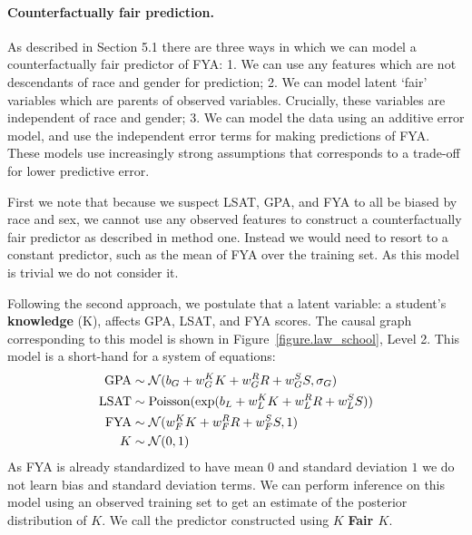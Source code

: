 \paragraph{Counterfactually fair prediction.}
As described in Section 5.1 there are three ways in which we can model a counterfactually fair predictor of FYA: 1. We can use any features which are not descendants of race and gender for prediction; 2. We can model latent `fair' variables which are parents of observed variables. Crucially, these variables are independent of race and gender; 3. We can model the data using an additive error model, and use the independent error terms for making predictions of FYA. These models use increasingly strong assumptions that corresponds to a trade-off for lower predictive error.

First we note that because we suspect LSAT, GPA, and FYA to all be biased by race and sex, we cannot use any observed features to construct a counterfactually fair predictor as described in method one. Instead we would need to resort to a constant predictor, such as the mean of FYA over the training set. As this model is trivial we do not consider it. 

Following the second approach, we postulate that a latent variable: a student's \textbf{knowledge} (K), affects GPA, LSAT, and FYA scores. The causal graph corresponding to this model is shown in Figure~\ref{figure.law_school}, Level 2. This model is a short-hand for a system of equations:
\begin{align}
\mbox{GPA} &\sim {\cal N}(b_{G} + w_{G}^K K + w_{G}^R R + w_{G}^S S, \sigma_{G}) \nonumber \\
\mbox{LSAT} &\sim \textrm{Poisson}(\exp(b_{L} + w_{L}^K K + w_{L}^R R + w_{L}^S S)) \nonumber \\
\mbox{FYA} &\sim {\cal N}(w_{F}^K K + w_{F}^R R + w_{F}^S S, 1) \nonumber \\
K &\sim {\cal N}(0,1) \nonumber
\end{align}
As FYA is already standardized to have mean $0$ and standard deviation $1$ we do not learn bias and standard deviation terms. We can perform inference on this model using an observed training set to get an estimate of the posterior distribution of $K$. We call the predictor constructed using $K$ \textbf{Fair $K$}.


